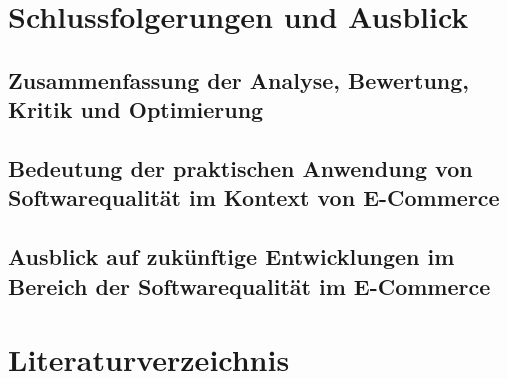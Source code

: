 \documentclass{article}
\begin{document}
\section{Schlussfolgerungen und Ausblick}
\subsection{Zusammenfassung der Analyse, Bewertung, Kritik und Optimierung}
\subsection{Bedeutung der praktischen Anwendung von Softwarequalität im Kontext von E-Commerce}
\subsection{Ausblick auf zukünftige Entwicklungen im Bereich der Softwarequalität im E-Commerce}

\section{Literaturverzeichnis}
\printbibliography[title={quellen.tex}]
\end{document}
